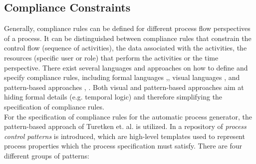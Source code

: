 
\subsection{Compliance Constraints} \label{sec:conception_compliance}

Generally, compliance rules can be defined for different process flow perspectives of a process. It can be distinguished between compliance rules that constrain the control flow (sequence of activities), the data associated with the activities, the resources (specific user or role) that perform the activities or the time perspective. There exist several languages and approaches on how to define and specify compliance rules, including formal languages \cite{Ghose2007},\cite{GovMilSad:edoc:06:compliance}, visual languages \cite{sabrina953},\cite{Awad2008} and pattern-based approaches \cite{compliance_patterns}, \cite{Ramezani2012}. Both visual and pattern-based approaches aim at hiding formal details (e.g. temporal logic) and therefore simplifying the specification of compliance rules. \\

For the specification of compliance rules for the automatic process generator, the pattern-based approach of Turetken et. al. \cite{compliance_patterns} is utilized. In \cite{compliance_patterns} a repository of \textit{process control patterns} is introduced, which are high-level templates used to represent process properties which the process specification must satisfy. There are four different groups of patterns: 

